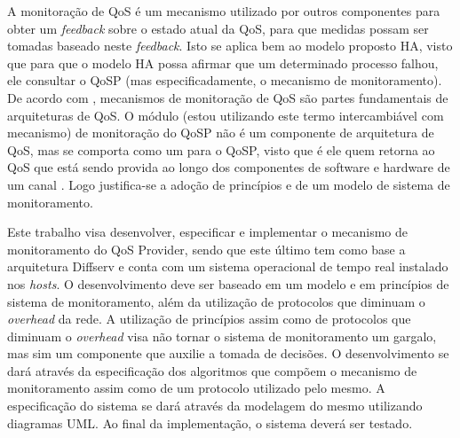 	A monitoração de QoS é um mecanismo utilizado por outros componentes para obter um \textit{feedback} sobre o estado atual da QoS, para que medidas possam ser tomadas baseado neste \textit{feedback}. Isto se aplica bem ao modelo proposto HA, visto que para que o modelo HA possa afirmar que um determinado processo falhou, ele consultar o QoSP (mas especificadamente, o mecanismo de monitoramento). De acordo com \cite{ACH96}, mecanismos de monitoração de QoS são partes fundamentais de arquiteturas de QoS. O módulo (estou utilizando este termo intercambiável com mecanismo) de monitoração do QoSP não é um componente de arquitetura de QoS, mas se comporta como um para o QoSP, visto que é ele quem retorna ao QoS que está sendo provida ao longo dos componentes de software e hardware de um canal \cite{ACH96}. Logo justifica-se a adoção de princípios e de um modelo de sistema de monitoramento.
	
	Este trabalho visa desenvolver, especificar e implementar o mecanismo de monitoramento do QoS Provider, sendo que este último tem como base a arquitetura Diffserv e conta com um sistema operacional de tempo real instalado nos \textit{hosts}. O desenvolvimento deve ser baseado em um modelo e em princípios de sistema de monitoramento, além da utilização de protocolos que diminuam o \textit{overhead} da rede. A utilização de princípios assim como de protocolos que diminuam o \textit{overhead} visa não tornar o sistema de monitoramento um gargalo, mas sim um componente que auxilie a tomada de decisões. O desenvolvimento se dará através da especificação dos algoritmos que compõem o mecanismo de monitoramento assim como de um protocolo utilizado pelo mesmo. A especificação do sistema se dará através da modelagem do mesmo utilizando diagramas UML. Ao final da implementação, o sistema deverá ser testado.